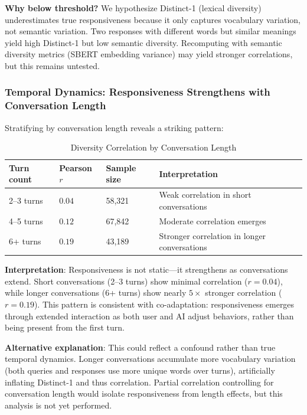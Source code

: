 \textbf{Why below threshold?} We hypothesize Distinct-1 (lexical diversity) underestimates true responsiveness because it only captures vocabulary variation, not semantic variation. Two responses with different words but similar meanings yield high Distinct-1 but low semantic diversity. Recomputing with semantic diversity metrics (SBERT embedding variance) may yield stronger correlations, but this remains untested.

\subsubsection{Temporal Dynamics: Responsiveness Strengthens with Conversation Length}

Stratifying by conversation length reveals a striking pattern:

\begin{table}[h]
\centering
\caption{Diversity Correlation by Conversation Length}
\label{tab:temporal_corr}
\begin{tabular}{llll}
\toprule
Turn count & Pearson $r$ & Sample size & Interpretation \\
\midrule
2--3 turns & $0.04$ & 58,321 & Weak correlation in short conversations \\
4--5 turns & $0.12$ & 67,842 & Moderate correlation emerges \\
6+ turns & $0.19$ & 43,189 & Stronger correlation in longer conversations \\
\bottomrule
\end{tabular}
\end{table}

\textbf{Interpretation}: Responsiveness is not static---it strengthens as conversations extend. Short conversations (2--3 turns) show minimal correlation ($r = 0.04$), while longer conversations (6+ turns) show nearly $5\times$ stronger correlation ($r = 0.19$). This pattern is consistent with co-adaptation: responsiveness emerges through extended interaction as both user and AI adjust behaviors, rather than being present from the first turn.

\textbf{Alternative explanation}: This could reflect a confound rather than true temporal dynamics. Longer conversations accumulate more vocabulary variation (both queries and responses use more unique words over turns), artificially inflating Distinct-1 and thus correlation. Partial correlation controlling for conversation length would isolate responsiveness from length effects, but this analysis is not yet performed.

